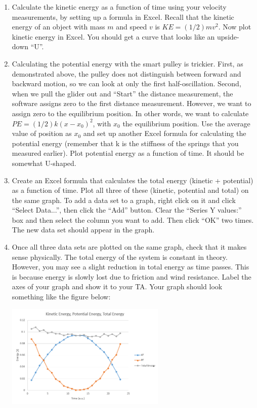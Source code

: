 \begin{enumerate}[label=\arabic*.]
\item 
	Calculate the kinetic energy as a function of time using your velocity
	measurements, by setting up a formula in Excel.
	Recall that the kinetic energy of an object with mass $m$ and speed $v$
	is $KE=(1/2)mv^2$.
	Now plot kinetic energy in Excel.  
	You should get a curve that looks like an upside-down ``U''.

\item Calculating the potential energy with the smart pulley is trickier.  First, as demonstrated above, the pulley does not distinguish between forward and backward motion, so we can look at only the first half-oscillation.  Second, when we pull the glider out and ``Start'' the distance measurement, the software assigns zero to the first distance measurement.  However, we want to assign zero to the equilibrium position.  In other words, we want to calculate \(PE = (1/2)k(x-x_0)^2\), with \(x_0\) the equilibrium position.  Use the average value of position as \(x_0\) and set up another Excel formula for calculating the potential energy (remember that k is the stiffness of the springs that you measured earlier).  Plot potential energy as a function of time.  It should be somewhat U-shaped.  

\item Create an Excel formula that calculates the total energy (kinetic + potential) as a function of time.  Plot all three of these (kinetic, potential and total) on the same graph.  To add a data set to a graph, right click on it and click ``Select Data...'', then click the ``Add'' button.  Clear the ``Series Y values:'' box and then select the column you want to add.  Then click ``OK'' two times.  The new data set should appear in the graph.

\item Once all three data sets are plotted on the same graph, check that it makes sense physically.  The total energy of the system is constant in theory.  However, you may see a slight reduction in total energy as time passes.  This is because energy is slowly lost due to friction and wind resistance.  Label the axes of your graph and show it to your TA.
Your graph should look something like the figure below:
\begin{center} \includegraphics*[width=0.6\textwidth]{imgs/6labs/6Alab/6Aexp4/excel-graph.png} \end{center}


\end{enumerate}
